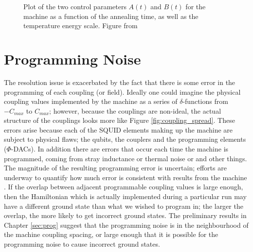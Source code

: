 \begin{figure}
	\caption[\machine Evolution Trajectory]{Plot of the two control parameters $A(t)$ and $B(t)$ for the \machine machine as a function of the annealing time, as well as the temperature energy scale.  Figure from \cite{pudenz}}
	\label{fig:trajectory}
\end{figure}

\section{Programming Noise}
\label{sec:noise}
The resolution issue is exacerbated by the fact that there is some error in the programming of each coupling (or field).  Ideally one could imagine the physical coupling values implemented by the machine as a series of $\delta$-functions from $-C_{max}$ to $C_{max}$; however, because the couplings are non-ideal, the actual structure of the couplings looks more like Figure \ref{fig:coupling_spread}.  These errors arise because each of the SQUID elements making up the machine are subject to physical flaws; the qubits, the couplers and the programming elements ($\Phi$-DACs). In addition there are errors that occur each time the machine is programmed, coming from stray inductance or thermal noise or and other things.  The magnitude of the resulting programming error is uncertain; efforts are underway to quantify how much error is consistent with results from the machine \cite{aaron}.  If the overlap between adjacent programmable coupling values is large enough, then the Hamiltonian which is actually implemented during a particular run may have a different ground state than what we wished to program in; the larger the overlap, the more likely to get incorrect ground states.  The preliminary results in Chapter \ref{sec:prog} suggest that the programming noise is in the neighbourhood of the machine coupling spacing, or large enough that it is possible for the programming noise to cause incorrect ground states.

